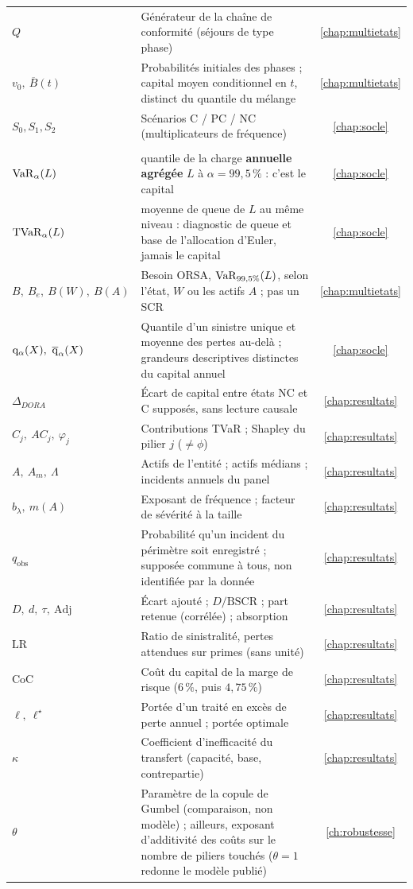 {\begin{longtable}{>{\raggedright}p{3.3cm} >{\raggedright\arraybackslash}p{10.2cm} c}
$Q$ & Générateur de la chaîne de conformité (séjours de type phase) & \ref{chap:multietats} \\
$v_0,\ \overline B(t)$ & Probabilités initiales des phases ; capital moyen conditionnel en $t$, distinct du quantile du mélange & \ref{chap:multietats} \\
$S_0,S_1,S_2$ & Scénarios C / PC / NC (multiplicateurs de fréquence) & \ref{chap:socle} \\
\midrule
\multicolumn{3}{@{}l}{\emph{\textcolor{navy}{Capital, allocation et décision}}} \\
$\mathrm{VaR}_\alpha(L)$ & quantile de la charge \textbf{annuelle agrégée} $L$ à $\alpha=99{,}5\,\%$ : c'est le capital & \ref{chap:socle} \\
$\mathrm{TVaR}_\alpha(L)$ & moyenne de queue de $L$ au même niveau : diagnostic de queue et base de l'allocation d'Euler, jamais le capital & \ref{chap:socle} \\
$B,\ B_e,\ B(W),\ B(A)$ & Besoin ORSA, $\mathrm{VaR}_{99{,}5\%}(L)$, selon l'état, $W$ ou les actifs $A$ ; pas un SCR & \ref{chap:multietats} \\
$\mathrm{q}_\alpha(X),\ \overline{\mathrm{q}}_\alpha(X)$ & Quantile d'un sinistre unique et moyenne des pertes au-delà ; grandeurs descriptives distinctes du capital annuel & \ref{chap:socle} \\
$\Delta_{DORA}$ & Écart de capital entre états NC et C supposés, sans lecture causale & \ref{chap:resultats} \\
$C_j,\ AC_j,\ \varphi_j$ & Contributions TVaR ; Shapley du pilier $j$ ($\neq\phi$) & \ref{chap:resultats} \\
$A,\ A_m,\ \Lambda$ & Actifs de l'entité ; actifs médians ; incidents annuels du panel & \ref{chap:resultats} \\
$b_\lambda,\ m(A)$ & Exposant de fréquence ; facteur de sévérité à la taille & \ref{chap:resultats} \\
$q_{\mathrm{obs}}$ & Probabilité qu'un incident du périmètre soit enregistré ; supposée commune à tous, non identifiée par la donnée & \ref{chap:resultats} \\
$D,\ d,\ \tau,\ \mathrm{Adj}$ & Écart ajouté ; $D/\mathrm{BSCR}$ ; part retenue (corrélée) ; absorption & \ref{chap:resultats} \\
$\mathrm{LR}$ & Ratio de sinistralité, pertes attendues sur primes (sans unité) & \ref{chap:resultats} \\
$\mathrm{CoC}$ & Coût du capital de la marge de risque ($6\,\%$, puis $4{,}75\,\%$) & \ref{chap:resultats} \\
$\ell,\ \ell^\star$ & Portée d'un traité en excès de perte annuel ; portée optimale & \ref{chap:resultats} \\
$\kappa$ & Coefficient d'inefficacité du transfert (capacité, base, contrepartie) & \ref{chap:resultats} \\
$\theta$ & Paramètre de la copule de Gumbel (comparaison, non modèle) ; ailleurs, exposant d'additivité des coûts sur le nombre de piliers touchés ($\theta=1$ redonne le modèle publié) & \ref{ch:robustesse} \\
\end{longtable}
}

\clearpage


